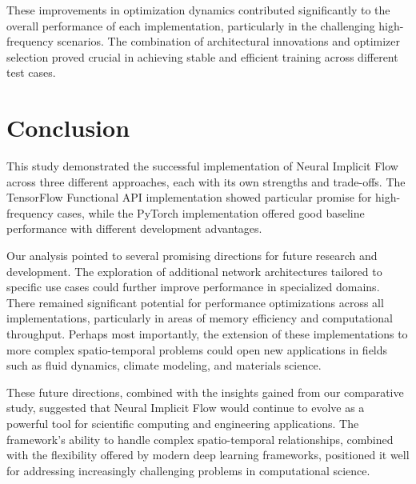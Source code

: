 \documentclass[10pt,journal,compsoc,onecolumn]{IEEEtran}
\begin{document}
These improvements in optimization dynamics contributed significantly to the overall performance of each implementation, particularly in the challenging high-frequency scenarios. The combination of architectural innovations and optimizer selection proved crucial in achieving stable and efficient training across different test cases.

\section{Conclusion}\label{sec:conclusion}
This study demonstrated the successful implementation of Neural Implicit Flow across three different approaches, each with its own strengths and trade-offs. The TensorFlow Functional API implementation showed particular promise for high-frequency cases, while the PyTorch implementation offered good baseline performance with different development advantages.

Our analysis pointed to several promising directions for future research and development. The exploration of additional network architectures tailored to specific use cases could further improve performance in specialized domains. There remained significant potential for performance optimizations across all implementations, particularly in areas of memory efficiency and computational throughput. Perhaps most importantly, the extension of these implementations to more complex spatio-temporal problems could open new applications in fields such as fluid dynamics, climate modeling, and materials science.

These future directions, combined with the insights gained from our comparative study, suggested that Neural Implicit Flow would continue to evolve as a powerful tool for scientific computing and engineering applications. The framework's ability to handle complex spatio-temporal relationships, combined with the flexibility offered by modern deep learning frameworks, positioned it well for addressing increasingly challenging problems in computational science.



\end{document}
